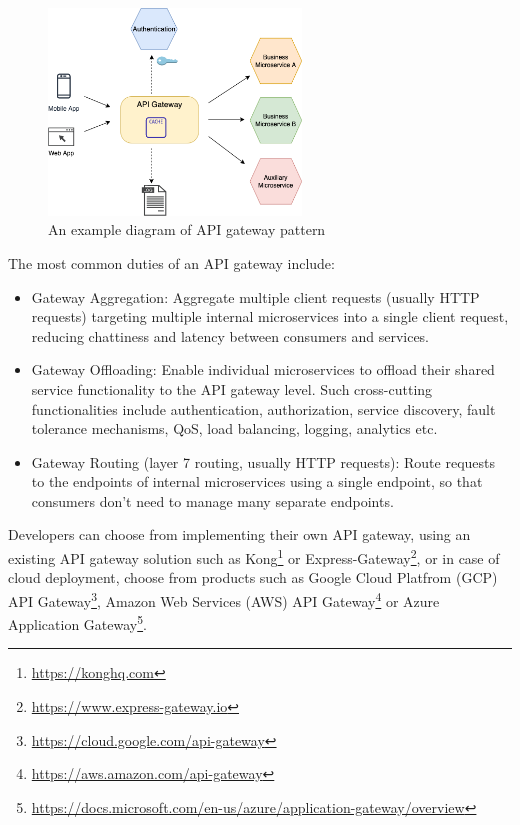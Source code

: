 \documentclass{Configuration_Files/PoliMi3i_thesis}
\begin{document}
\begin{figure}[H]
    \centering
    \includegraphics[width=0.6\textwidth]{myImages/APIgw.png}
    \caption{An example diagram of API gateway pattern}
    \label{fig:api_gateway}
\end{figure}

The most common duties of an API gateway include:

\begin{itemize}
    \item Gateway Aggregation: Aggregate multiple client requests (usually HTTP requests) targeting multiple internal microservices into a single client request, reducing chattiness and latency between consumers and services.
    
    \item Gateway Offloading: Enable individual microservices to offload their shared service functionality to the API gateway level.
    Such cross-cutting functionalities include authentication, authorization, service discovery, fault tolerance mechanisms, QoS, load balancing, logging, analytics etc.
    
    \item Gateway Routing (layer 7 routing, usually HTTP requests): Route requests to the endpoints of internal microservices using a single endpoint, so that consumers don’t need to manage many separate endpoints.
\end{itemize}

Developers can choose from implementing their own API gateway, using an existing API gateway solution such as Kong\footnote{\href{https://konghq.com}{https://konghq.com}} or Express-Gateway\footnote{\href{https://www.express-gateway.io}{https://www.express-gateway.io}}, or in case of cloud deployment, choose from products such as Google Cloud Platfrom (GCP) API Gateway\footnote{\href{https://cloud.google.com/api-gateway}{https://cloud.google.com/api-gateway}}, Amazon Web Services (AWS) API Gateway\footnote{\href{https://aws.amazon.com/api-gateway}{https://aws.amazon.com/api-gateway}} or Azure Application Gateway\footnote{\href{https://docs.microsoft.com/en-us/azure/application-gateway/overview}{https://docs.microsoft.com/en-us/azure/application-gateway/overview}}.
\end{document}
